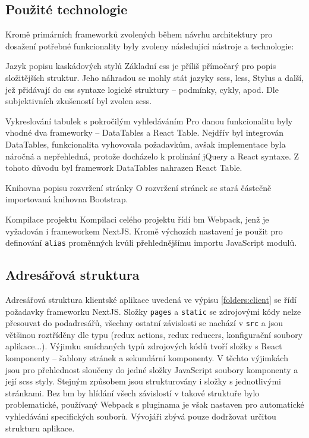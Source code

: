 \subsection{Použité technologie}

Kromě primárních frameworků zvolených během návrhu architektury pro dosažení potřebné funkcionality byly zvoleny následující nástroje a technologie:

\begin{dl}
   \item [Jazyk popisu kaskádových stylů] Základní \gls{css} je příliš přímočarý pro popis složitějších struktur. Jeho náhradou se mohly stát jazyky \gls{scss}, \gls{less}, Stylus a další, jež přidávají do \gls{css} syntaxe logické struktury -- podmínky, cykly, apod. Dle subjektivních zkušeností byl zvolen \gls{scss}.
   
   \item [Vykreslování tabulek s pokročilým vyhledáváním] Pro danou funkcionalitu byly vhodné dva frameworky -- DataTables a React Table. Nejdřív byl integrován DataTables, funkcionalita vyhovovala požadavkům, avšak implementace byla náročná a nepřehledná, protože docházelo k prolínání jQuery a React syntaxe. Z tohoto důvodu byl framework DataTables nahrazen React Table.
   
   \item [Knihovna popisu rozvržení stránky] O rozvržení stránek se stará částečně importovaná knihovna Bootstrap.
   
   \item [Kompilace projektu] Kompilaci celého projektu řídí \gls{bm} Webpack, jenž je vyžadován i frameworkem NextJS. Kromě výchozích nastavení je použit pro definování \texttt{alias} proměnných kvůli přehlednějšímu importu JavaScript modulů.
\end{dl}



\subsection{Adresářová struktura}

Adresářová struktura klientské aplikace uvedená ve výpisu \ref{folders:client} se řídí požadavky frameworku \mbox{NextJS}. Složky \texttt{pages} a \texttt{static} se zdrojovými kódy nelze přesouvat do podadresářů, všechny ostatní závislosti se nachází v \texttt{src} a jsou většinou roztříděny dle typu (redux actions, redux reducers, konfigurační soubory aplikace...). Výjimku smíchaných typů zdrojových kódů tvoří složky s React komponenty -- šablony stránek a sekundární komponenty. V těchto výjimkách jsou pro přehlednost sloučeny do jedné složky JavaScript soubory komponenty a její \gls{scss} styly. Stejným způsobem jsou strukturovány i složky s jednotlivými stránkami. Bez \gls{bm} by hlídání všech závislostí v takové struktuře bylo problematické, používaný Webpack s pluginama je však nastaven pro automatické vyhledávání specifických souborů. Vývojáři zbývá pouze dodržovat určitou strukturu aplikace.

